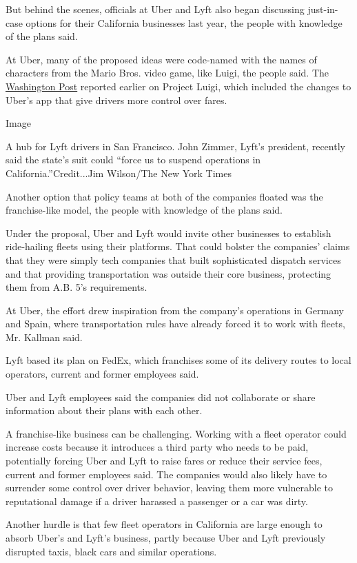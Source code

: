 But behind the scenes, officials at Uber and Lyft also began discussing
just-in-case options for their California businesses last year, the
people with knowledge of the plans said.

At Uber, many of the proposed ideas were code-named with the names of
characters from the Mario Bros. video game, like Luigi, the people said.
The
\href{https://www.washingtonpost.com/technology/2020/01/06/ubers-secret-project-bolster-its-case-against-ab-californias-gig-worker-law/}{Washington
Post} reported earlier on Project Luigi, which included the changes to
Uber's app that give drivers more control over fares.

Image

A hub for Lyft drivers in San Francisco. John Zimmer, Lyft's president,
recently said the state's suit could ``force us to suspend operations in
California.''Credit...Jim Wilson/The New York Times

Another option that policy teams at both of the companies floated was
the franchise-like model, the people with knowledge of the plans said.

Under the proposal, Uber and Lyft would invite other businesses to
establish ride-hailing fleets using their platforms. That could bolster
the companies' claims that they were simply tech companies that built
sophisticated dispatch services and that providing transportation was
outside their core business, protecting them from A.B. 5's requirements.

At Uber, the effort drew inspiration from the company's operations in
Germany and Spain, where transportation rules have already forced it to
work with fleets, Mr. Kallman said.

Lyft based its plan on FedEx, which franchises some of its delivery
routes to local operators, current and former employees said.

Uber and Lyft employees said the companies did not collaborate or share
information about their plans with each other.

A franchise-like business can be challenging. Working with a fleet
operator could increase costs because it introduces a third party who
needs to be paid, potentially forcing Uber and Lyft to raise fares or
reduce their service fees, current and former employees said. The
companies would also likely have to surrender some control over driver
behavior, leaving them more vulnerable to reputational damage if a
driver harassed a passenger or a car was dirty.

Another hurdle is that few fleet operators in California are large
enough to absorb Uber's and Lyft's business, partly because Uber and
Lyft previously disrupted taxis, black cars and similar operations.

